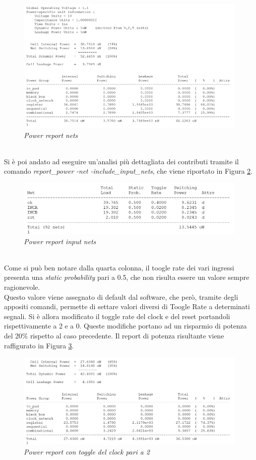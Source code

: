 \begin{figure}[!htb]
	\centering
	\includegraphics[scale=0.7]{immagini/3_1}
	\caption{\textit{Power report nets}}
	\label{3_1}
\end{figure}
\\
Si è poi andato ad eseguire un'analisi più dettagliata dei contributi tramite il comando \textit{report\_power -net -include\_input\_nets}, che viene riportato in Figura \ref{3_2}. \\
\begin{figure}[!htb]
	\centering
	\includegraphics[scale=0.9]{immagini/3_2}
	\caption{\textit{Power report input nets}}
	\label{3_2}
\end{figure}
\\
Come si può ben notare dalla quarta colonna, il toogle rate dei vari ingressi presenta una \textit{static probability} pari a 0.5, che non risulta essere un valore sempre ragionevole. \\
Questo valore viene assegnato di default dal software, che però, tramite degli appositi comandi, permette di settare valori diversi di Toogle Rate a determinati segnali. Si è allora modificato il toggle rate del clock e del reset portandoli rispettivamente a 2 e a 0. Queste modifiche portano ad un risparmio di potenza del 20\% rispetto al caso precedente. Il report di potenza risultante viene raffigurato in Figura \ref{3_3}.
\begin{figure}[!htb]
	\centering
	\includegraphics[scale=0.8]{immagini/3_3}
	\caption{\textit{Power report con toggle del clock pari a 2}}
	\label{3_3}
\end{figure}
